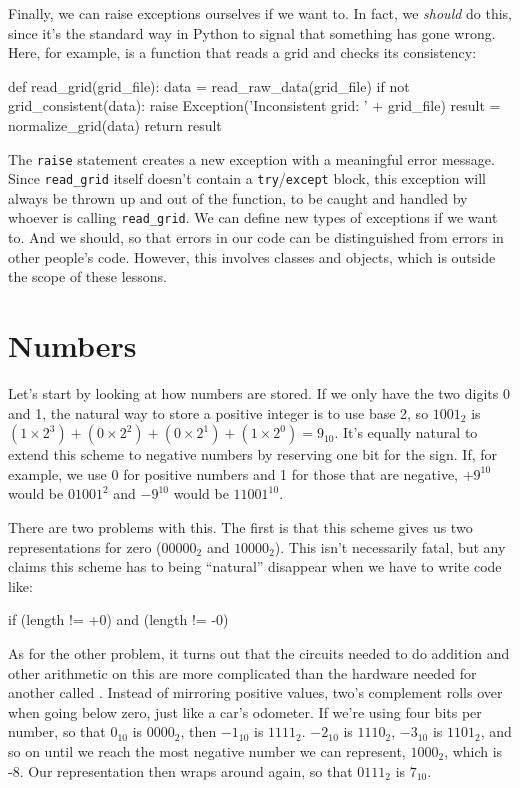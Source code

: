 \documentclass{book}
\begin{document}
Finally, we can raise exceptions ourselves if we want to. In fact, we
\emph{should} do this, since it's the standard way in Python to signal
that something has gone wrong. Here, for example, is a function that
reads a grid and checks its consistency:

\begin{VerbIn}
def read_grid(grid_file):
    data = read_raw_data(grid_file)
    if not grid_consistent(data):
        raise Exception('Inconsistent grid: ' + grid_file)
    result = normalize_grid(data)
    return result
\end{VerbIn}

The \texttt{raise} statement creates a new exception with a meaningful
error message. Since \texttt{read\_grid} itself doesn't contain a
\texttt{try}/\texttt{except} block, this exception will always be thrown
up and out of the function, to be caught and handled by whoever is
calling \texttt{read\_grid}. We can define new types of exceptions if we
want to. And we should, so that errors in our code can be distinguished
from errors in other people's code. However, this involves classes and
objects, which is outside the scope of these lessons.

\section{Numbers}

Let's start by looking at how numbers are stored. If we only have the
two digits 0 and 1, the natural way to store a positive integer is to
use base 2, so $1001_{2}$ is
$(1×2^{3})+(0×2^{2})+(0×2^{1})+(1×2^{0}) = 9_{10}$.
It's equally natural to extend this scheme to
negative numbers by reserving one bit for the sign. If, for example, we
use 0 for positive numbers and 1 for those that are negative,
$+9^{10}$ would be $01001^{2}$ and
$-9^{10}$ would be $11001^{10}$.

There are two problems with this. The first is that this scheme gives us
two representations for zero ($00000_{2}$ and
$10000_{2}$). This isn't necessarily fatal, but any claims
this scheme has to being ``natural'' disappear when we have to write
code like:

\begin{VerbIn}
if (length != +0) and (length != -0)
\end{VerbIn}

As for the other problem, it turns out that the circuits needed to do
addition and other arithmetic on this
 are
more complicated than the hardware needed for another called
. Instead of mirroring
positive values, two's complement rolls over when going below zero, just
like a car's odometer. If we're using four bits per number, so that
$0_{10}$ is $0000_{2}$, then $-1_{10}$
is $1111_{2}$. $-2_{10}$ is $1110_{2}$,
$-3_{10}$ is $1101_{2}$, and so on until we reach
the most negative number we can represent, $1000_{2}$, which
is -8. Our representation then wraps around again, so that
$0111_{2}$ is $7_{10}$.
\end{document}
